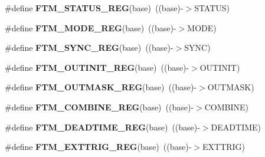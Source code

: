 \begin{DoxyCompactItemize}
\item 
\#define {\bfseries F\+T\+M\+\_\+\+S\+T\+A\+T\+U\+S\+\_\+\+R\+EG}(base)~((base)-\/$>$S\+T\+A\+T\+US)\hypertarget{group__FTM__Register__Accessor__Macros_ga4cec1a1a019e0eea5d1d57a41cfa4d20}{}\label{group__FTM__Register__Accessor__Macros_ga4cec1a1a019e0eea5d1d57a41cfa4d20}

\item 
\#define {\bfseries F\+T\+M\+\_\+\+M\+O\+D\+E\+\_\+\+R\+EG}(base)~((base)-\/$>$M\+O\+DE)\hypertarget{group__FTM__Register__Accessor__Macros_gac6721d8c0d820dfde24dad153be55136}{}\label{group__FTM__Register__Accessor__Macros_gac6721d8c0d820dfde24dad153be55136}

\item 
\#define {\bfseries F\+T\+M\+\_\+\+S\+Y\+N\+C\+\_\+\+R\+EG}(base)~((base)-\/$>$S\+Y\+NC)\hypertarget{group__FTM__Register__Accessor__Macros_gae56d9f6198c388377ce87fb5be02dfe0}{}\label{group__FTM__Register__Accessor__Macros_gae56d9f6198c388377ce87fb5be02dfe0}

\item 
\#define {\bfseries F\+T\+M\+\_\+\+O\+U\+T\+I\+N\+I\+T\+\_\+\+R\+EG}(base)~((base)-\/$>$O\+U\+T\+I\+N\+IT)\hypertarget{group__FTM__Register__Accessor__Macros_gaba20d1c0f19cccba4d31374bc26585cc}{}\label{group__FTM__Register__Accessor__Macros_gaba20d1c0f19cccba4d31374bc26585cc}

\item 
\#define {\bfseries F\+T\+M\+\_\+\+O\+U\+T\+M\+A\+S\+K\+\_\+\+R\+EG}(base)~((base)-\/$>$O\+U\+T\+M\+A\+SK)\hypertarget{group__FTM__Register__Accessor__Macros_ga109174aa9e97a6e04573071c942addda}{}\label{group__FTM__Register__Accessor__Macros_ga109174aa9e97a6e04573071c942addda}

\item 
\#define {\bfseries F\+T\+M\+\_\+\+C\+O\+M\+B\+I\+N\+E\+\_\+\+R\+EG}(base)~((base)-\/$>$C\+O\+M\+B\+I\+NE)\hypertarget{group__FTM__Register__Accessor__Macros_ga90eedd735bb2760dfe8aae6615ed7bd5}{}\label{group__FTM__Register__Accessor__Macros_ga90eedd735bb2760dfe8aae6615ed7bd5}

\item 
\#define {\bfseries F\+T\+M\+\_\+\+D\+E\+A\+D\+T\+I\+M\+E\+\_\+\+R\+EG}(base)~((base)-\/$>$D\+E\+A\+D\+T\+I\+ME)\hypertarget{group__FTM__Register__Accessor__Macros_ga674f9acdcb33dc79b3ab26178f0098e8}{}\label{group__FTM__Register__Accessor__Macros_ga674f9acdcb33dc79b3ab26178f0098e8}

\item 
\#define {\bfseries F\+T\+M\+\_\+\+E\+X\+T\+T\+R\+I\+G\+\_\+\+R\+EG}(base)~((base)-\/$>$E\+X\+T\+T\+R\+IG)\hypertarget{group__FTM__Register__Accessor__Macros_gaf89cac15c7c4e4ea83f717b28e00d88f}{}\label{group__FTM__Register__Accessor__Macros_gaf89cac15c7c4e4ea83f717b28e00d88f}


\end{DoxyCompactItemize}
